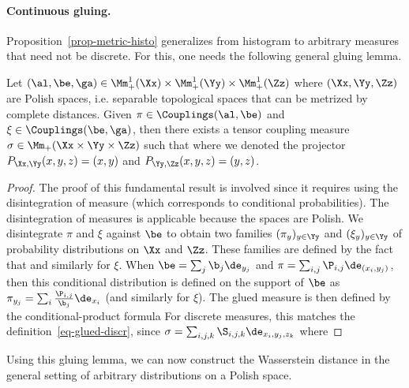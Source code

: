 \paragraph{Continuous gluing.}

Proposition~\ref{prop-metric-histo} generalizes from histogram to arbitrary measures that need not be discrete. For this, one needs the following general gluing lemma.

\begin{lem}\label{lem-gluing-general}
	Let $(\al,\be,\ga) \in \Mm_+^1(\Xx) \times \Mm_+^1(\Yy) \times \Mm_+^1(\Zz)$
	where $(\Xx,\Yy,\Zz)$ are Polish spaces, i.e. separable topological spaces that can be metrized by complete distances.
	Given $\pi \in \Couplings(\al,\be)$ and $\xi \in \Couplings(\be,\ga)$, then there exists a tensor coupling measure
	$\sigma \in \Mm_+(\Xx \times \Yy \times \Zz)$ such that
	where we denoted the projector $P_{\Xx,\Yy}(x,y,z)=(x,y)$ and $P_{\Yy,\Zz}(x,y,z)=(y,z)$.
\end{lem}
\begin{proof}
	The proof of this fundamental result is involved since it requires using the disintegration of measure (which corresponds to conditional probabilities).
	The disintegration of measures is applicable because the spaces are Polish.
	We disintegrate $\pi$ and $\xi$ against $\be$ to obtain two families $(\pi_y)_{y \in \Yy}$ and $(\xi_y)_{y \in \Yy}$ of probability distributions on $\Xx$ and $\Zz$. These families are defined by the fact that
	and similarly for $\xi$.
	When $\be=\sum_j \b_j \de_{y_j}$ and $\pi=\sum_{i,j} \P_{i,j} \de_{(x_i,y_j)}$, then this conditional distribution is defined on the support of $\be$ as
	$\pi_{y_j} = \sum_i \frac{\P_{i,j}}{\b_j} \de_{x_i}$ (and similarly for $\xi$).
		The glued measure is then defined by the conditional-product formula
	For discrete measures, this matches the definition~\eqref{eq-glued-discr}, since $\sigma=\sum_{i,j,k} \S_{i,j,k} \de_{x_i,y_j,z_k}$ where
\end{proof}

Using this gluing lemma, we can now construct the Wasserstein distance in the general setting of arbitrary distributions on a Polish space.

